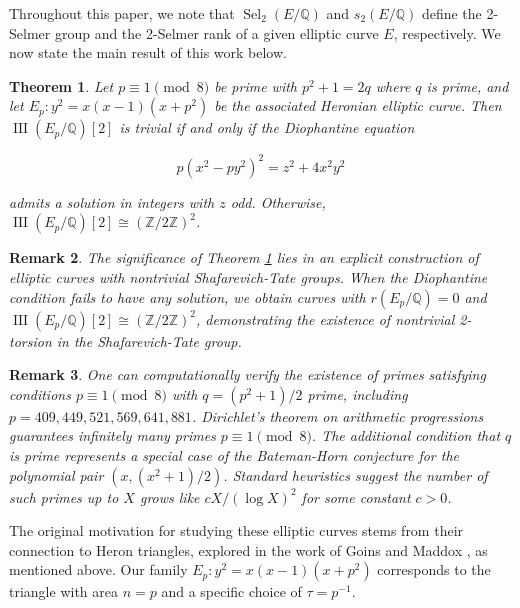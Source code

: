 \documentclass[10pt]{article}
\DeclareMathOperator{\III}{III}
\newtheorem{theorem}{Theorem}[section]
\newtheorem{remark}[theorem]{Remark}
\begin{document}
Throughout this paper, we note that \(\operatorname{Sel}_{2}(E/\mathbb{Q})\) and \(s_{2}(E/\mathbb{Q})\) define the 2-Selmer group and the 2-Selmer rank of a given elliptic curve \(E\), respectively. We now state the main result of this work below.

\setcounter{theorem}{2}
\begin{theorem}\label{thm:main}
Let \(p \equiv 1 \pmod{8}\) be prime with \(p^{2} + 1 = 2q\) where \(q\) is prime, and let \(E_{p}: y^{2} = x(x - 1)(x + p^{2})\) be the associated Heronian elliptic curve. Then \(\III(E_{p}/\mathbb{Q})[2]\) is trivial if and only if the Diophantine equation

\[p(x^{2} - py^{2})^{2} = z^{2} + 4x^{2}y^{2}\]

admits a solution in integers with \(z\) odd. Otherwise, \(\III(E_{p}/\mathbb{Q})[2] \cong (\mathbb{Z}/2\mathbb{Z})^{2}\).
\end{theorem}

\begin{remark}\label{rem:significance}
The significance of Theorem \ref{thm:main} lies in an explicit construction of elliptic curves with nontrivial Shafarevich-Tate groups. When the Diophantine condition fails to have any solution, we obtain curves with \(r(E_{p}/\mathbb{Q}) = 0\) and \(\III(E_{p}/\mathbb{Q})[2] \cong (\mathbb{Z}/2\mathbb{Z})^{2}\), demonstrating the existence of nontrivial 2-torsion in the Shafarevich-Tate group.
\end{remark}

\begin{remark}\label{rem:primes}
One can computationally verify the existence of primes satisfying conditions \(p \equiv 1 \pmod{8}\) with \(q = (p^{2} + 1)/2\) prime, including \(p = 409, 449, 521, 569, 641, 881\). Dirichlet's theorem on arithmetic progressions \cite{20} guarantees infinitely many primes \(p \equiv 1 \pmod{8}\). The additional condition that \(q\) is prime represents a special case of the Bateman-Horn conjecture \cite{1} for the polynomial pair \((x, (x^{2}+1)/2)\). Standard heuristics suggest the number of such primes up to \(X\) grows like \(cX/(\log X)^{2}\) for some constant \(c > 0\).
\end{remark}

The original motivation for studying these elliptic curves stems from their connection to Heron triangles, explored in the work of Goins and Maddox \cite{14}, as mentioned above. Our family \(E_{p}: y^{2} = x(x - 1)(x + p^{2})\) corresponds to the triangle with area \(n = p\) and a specific choice of \(\tau = p^{-1}\).
\end{document}
